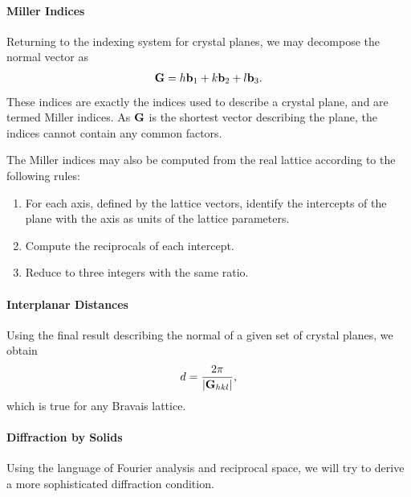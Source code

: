\paragraph{Miller Indices}
Returning to the indexing system for crystal planes, we may decompose the normal vector as
\begin{align*}
	\vb{G} = h\vb{b}_{1} + k\vb{b}_{2} + l\vb{b}_{3}.
\end{align*}
These indices are exactly the indices used to describe a crystal plane, and are termed Miller indices. As $\vb{G}$ is the shortest vector describing the plane, the indices cannot contain any common factors.

The Miller indices may also be computed from the real lattice according to the following rules:
\begin{enumerate}
	\item For each axis, defined by the lattice vectors, identify the intercepts of the plane with the axis as units of the lattice parameters.
	\item Compute the reciprocals of each intercept.
	\item Reduce to three integers with the same ratio.
\end{enumerate}

\paragraph{Interplanar Distances}
Using the final result describing the normal of a given set of crystal planes, we obtain
\begin{align*}
	d = \frac{2\pi}{\abs{\vb{G}_{hkl}}},
\end{align*}
which is true for any Bravais lattice.

\paragraph{Diffraction by Solids}
Using the language of Fourier analysis and reciprocal space, we will try to derive a more sophisticated diffraction condition.

